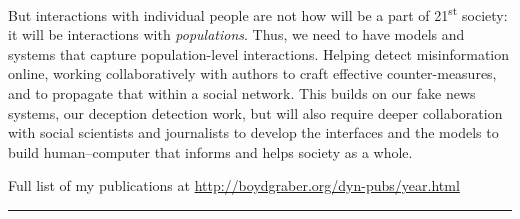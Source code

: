 But interactions with individual people are not how  will be a
part of 21\textsuperscript{st} society: it will be interactions with
\emph{populations}.
%
Thus, we need to have models and systems that capture population-level
interactions.
%
Helping detect misinformation online, working collaboratively with
authors to craft effective counter-measures, and to propagate that
within a social network.
%
This builds on our fake news systems, our deception detection work,
but will also require deeper collaboration with social scientists and
journalists to develop the interfaces and the models to build
human--computer  that informs and helps society as a whole.




\clearpage




\begin{center}
Full list of my publications at \url{http://boydgraber.org/dyn-pubs/year.html}
\end{center}


\noindent\rule{4cm}{0.4pt}

